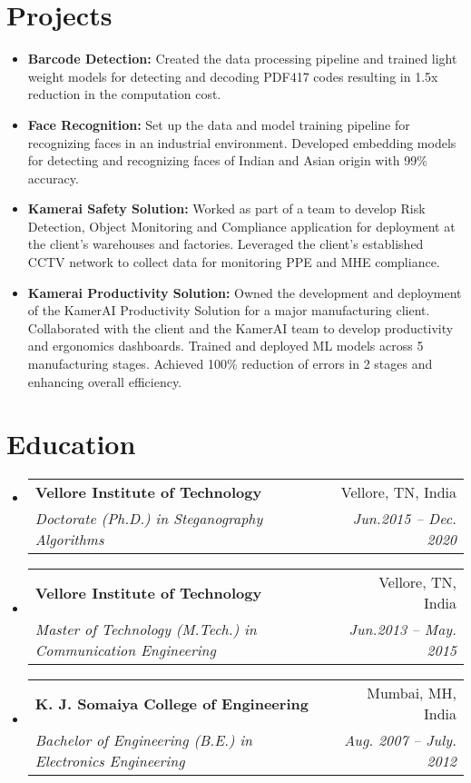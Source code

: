 \documentclass[a4paper,11pt]{article}
\makeatletter
\newcommand{\resumeSubheading}[4]{
  \vspace{-1pt}\item
    \begin{tabular*}{0.97\textwidth}[t]{l@{\extracolsep{\fill}}r}
      \textbf{#1} & #2 \\
      \textit{\small#3} & \textit{\small #4} \\
    \end{tabular*}\vspace{-5pt}
}
\newcommand{\resumeSubHeadingListStart}{\begin{itemize}[leftmargin=*]}
\newcommand{\resumeSubHeadingListEnd}{\end{itemize}}
\makeatother
\begin{document}
\section{Projects}
  \begin{itemize}[leftmargin=*, itemsep = -2pt]
    \item {\textbf{Barcode Detection:} Created the data processing pipeline and trained light weight models for detecting and decoding PDF417 codes resulting in 1.5x reduction in the computation cost.}
    \item {\textbf{Face Recognition:} Set up the data and model training pipeline for recognizing faces in an industrial environment. Developed embedding models for detecting and recognizing faces of Indian and Asian origin with 99\% accuracy.}
    \item {\textbf{Kamerai Safety Solution:} Worked as part of a team to develop Risk Detection, Object Monitoring and Compliance application for deployment at the client's warehouses and factories. Leveraged the client's established CCTV network to collect data for monitoring PPE and MHE compliance.}
    \item {\textbf{Kamerai Productivity Solution:} Owned the development and deployment of the KamerAI Productivity Solution for a major manufacturing client. Collaborated with the client and the KamerAI team to develop productivity and ergonomics dashboards. Trained and deployed ML models across 5 manufacturing stages. Achieved 100\% reduction of errors in 2 stages and enhancing overall efficiency.}
  \end{itemize}

\section{Education}
  \resumeSubHeadingListStart
    \resumeSubheading
      {Vellore Institute of Technology}{Vellore, TN, India}
      {Doctorate (Ph.D.) in Steganography Algorithms}{Jun.2015 -- Dec. 2020}
    \resumeSubheading
      {Vellore Institute of Technology}{Vellore, TN, India}
      {Master of Technology (M.Tech.) in Communication Engineering}{Jun.2013 -- May. 2015}
    \resumeSubheading
      {K. J. Somaiya College of Engineering}{Mumbai, MH, India}
      {Bachelor of Engineering (B.E.) in Electronics Engineering}{Aug. 2007 -- July. 2012}
  \resumeSubHeadingListEnd

\end{document}
